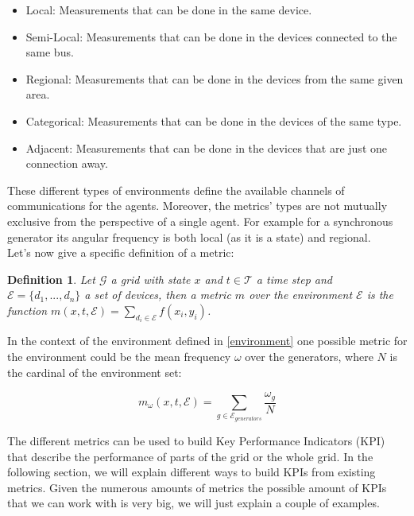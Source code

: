 \documentclass{report}
\newtheorem{definition}{Definition}
\begin{document}
\begin{itemize}
\item Local: Measurements that can be done in the same device. 
\item Semi-Local: Measurements that can be done in the devices connected to the same bus. 
\item Regional: Measurements that can be done in the devices from the same given area. 
\item Categorical: Measurements that can be done in the devices of the same type. 
\item Adjacent: Measurements that can be done in the devices that are just one connection away.
\end{itemize}

These different types of environments define the available channels of communications for the agents. Moreover, the metrics' types are not mutually exclusive from the perspective of a single agent. For example for a synchronous generator its angular frequency is both local (as it is a state) and regional. \\

Let's now give a specific definition of a metric:

\begin{definition}
    Let $\mathcal{G}$ a grid with state $x$ and $t \in \mathcal{T}$ a time step and $\mathcal{E} = \{d_1, ..., d_n\}$ a set of devices, 
    then a metric $m$ over the environment $\mathcal{E}$ is the function $m(x, t, \mathcal{E}) 
    = \sum_{d_i \in \mathcal{E}} f(x_i, y_i)$. 
\end{definition}

In the context of the environment defined in \ref{environment} one possible metric for the environment could be the mean frequency $\omega$ over the generators, where $N$ is the cardinal of the environment set:

\begin{equation}
    m_{\omega}(x, t, \mathcal{E}) = \sum_{g \in \mathcal{E}_{generators}} \frac{\omega_g}{N}
\end{equation}

The different metrics can be used to build Key Performance Indicators (KPI) that describe the performance of parts of the grid or the whole grid. In the following section, we will explain different ways to build KPIs from existing metrics. Given the numerous amounts of metrics the possible amount of KPIs that we can work with is very big, we will just explain a couple of examples. \\
\end{document}
